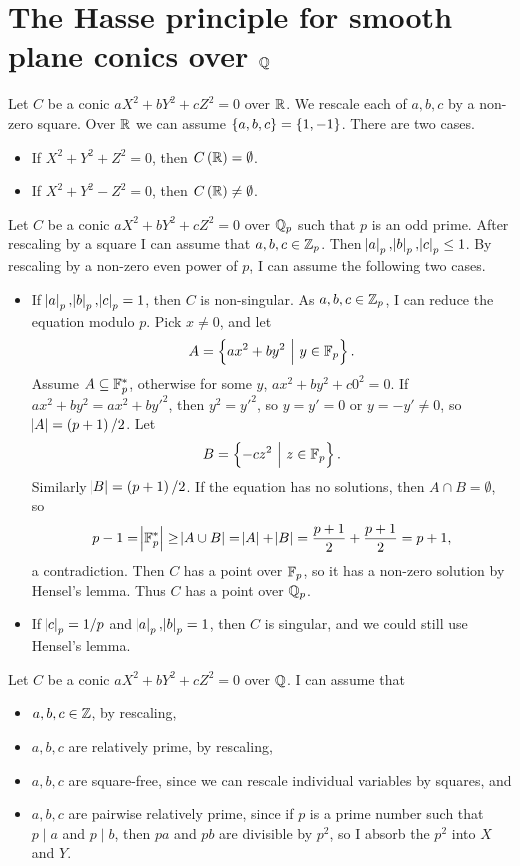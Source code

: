 \pagebreak

\section{The Hasse principle for smooth plane conics over \texorpdfstring{$ \mathbb{Q} $}{Q}}


Let $ C $ be a conic $ aX^2 + bY^2 + cZ^2 = 0 $ over $ \mathbb{R} $. We rescale each of $ a, b, c $ by a non-zero square. Over $ \mathbb{R} $ we can assume $ \cbr{a, b, c} = \cbr{1, -1} $. There are two cases.
\begin{itemize}
\item If $ X^2 + Y^2 + Z^2 = 0 $, then $ C\br{\RR} = \emptyset $.
\item If $ X^2 + Y^2 - Z^2 = 0 $, then $ C\br{\RR} \ne \emptyset $.
\end{itemize}
Let $ C $ be a conic $ aX^2 + bY^2 + cZ^2 = 0 $ over $ \mathbb{Q}_p $ such that $ p $ is an odd prime. After rescaling by a square I can assume that $ a, b, c \in \mathbb{Z}_p $. Then $ \abs{a}_p, \abs{b}_p, \abs{c}_p \le 1 $. By rescaling by a non-zero even power of $ p $, I can assume the following two cases.
\begin{itemize}
\item If $ \abs{a}_p, \abs{b}_p, \abs{c}_p = 1 $, then $ C $ is non-singular. As $ a, b, c \in \mathbb{Z}_p $, I can reduce the equation modulo $ p $. Pick $ x \ne 0 $, and let
$$ A = \cbr{ax^2 + by^2 \st y \in \FF_p}. $$
Assume $ A \subseteq \mathbb{F}_p^* $, otherwise for some $ y $, $ ax^2 + by^2 + c0^2 = 0 $. If $ ax^2 + by^2 = ax^2 + by'^2 $, then $ y^2 = y'^2 $, so $ y = y' = 0 $ or $ y = -y' \ne 0 $, so $ \abs{A} = \br{p + 1} / 2 $. Let
$$ B = \cbr{-cz^2 \st z \in \FF_p}. $$
Similarly $ \abs{B} = \br{p + 1} / 2 $. If the equation has no solutions, then $ A \cap B = \emptyset $, so
$$ p - 1 = \abs{\mathbb{F}_p^*} \ge \abs{A \cup B} = \abs{A} + \abs{B} = \dfrac{p + 1}{2} + \dfrac{p + 1}{2} = p + 1, $$
a contradiction. Then $ C $ has a point over $ \mathbb{F}_p $, so it has a non-zero solution by Hensel's lemma. Thus $ C $ has a point over $ \mathbb{Q}_p $.
\item If $ \abs{c}_p = 1 / p $ and $ \abs{a}_p, \abs{b}_p = 1 $, then $ C $ is singular, and we could still use Hensel's lemma.
\end{itemize}
Let $ C $ be a conic $ aX^2 + bY^2 + cZ^2 = 0 $ over $ \mathbb{Q} $. I can assume that
\begin{itemize}
\item $ a, b, c \in \mathbb{Z} $, by rescaling,
\item $ a, b, c $ are relatively prime, by rescaling,
\item $ a, b, c $ are square-free, since we can rescale individual variables by squares, and
\item $ a, b, c $ are pairwise relatively prime, since if $ p $ is a prime number such that $ p \mid a $ and $ p \mid b $, then $ pa $ and $ pb $ are divisible by $ p^2 $, so I absorb the $ p^2 $ into $ X $ and $ Y $.
\end{itemize}
